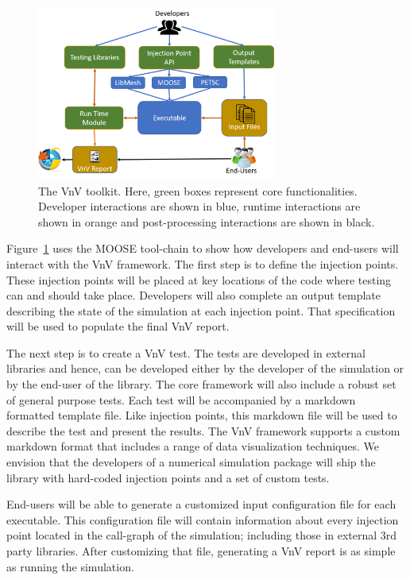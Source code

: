 \begin{figure}
\centering
 \includegraphics[width=0.7\textwidth]{./narrative/figures/VnVOut.png}
 \caption{ The VnV toolkit. Here, green boxes represent core functionalities. Developer interactions are shown in blue, runtime interactions are shown in orange and post-processing interactions are shown in black. \label{fig:toolchain} } 
\end{figure}
 
Figure~\ref{fig:toolchain} uses the MOOSE tool-chain to show how developers and end-users will interact with the VnV framework. The first step is to define the injection points. These injection points will be placed at key locations of the code where testing can and should take place. Developers will also complete an output template describing the state of the simulation at each injection point. That specification will be used to populate the final VnV report. 

The next step is to create a VnV test. The tests are developed in external libraries and hence, can be developed either by the developer of the simulation or by the end-user of the library. The core framework will also include a robust set of general purpose \VV tests. Each test will be accompanied by a markdown formatted template file. Like injection points, this markdown file will be used to
describe the test and present the results. The VnV framework supports a custom markdown format that includes a range of data visualization techniques. We envision that the developers of a numerical simulation package will ship the library with hard-coded injection points and a set of custom \VV tests. 

End-users will be able to generate a customized input configuration file for each executable. This configuration file will contain information about every injection point located in the call-graph of the simulation; including those in external 3rd party libraries. After customizing that file, generating a VnV report is as simple as running the simulation.
 
